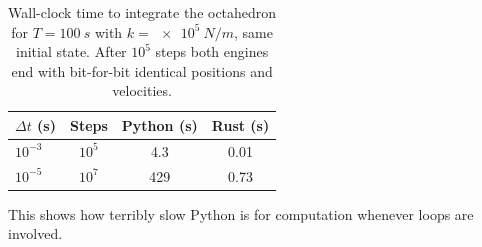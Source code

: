 \begin{table}[htb]
    \centering
    \caption{Wall-clock time to integrate the octahedron for $T=\SI{100}{s}$ with $k=\SI{e5}{N/m}$, same initial state. After $10^5$ steps both engines end with bit-for-bit identical positions and velocities.}
    \label{tab:performance}
    \small
    \begin{tabular}{@{}lccc@{}}
        \toprule
        $\Delta t$ (s) & Steps & Python (s) & Rust (s) \\
        \midrule
        $10^{-3}$ & $10^5$ & 4.3 & 0.01 \\
        $10^{-5}$ & $10^7$ & 429 & 0.73 \\
        \bottomrule
    \end{tabular}
\end{table}
This shows how terribly slow Python is for computation whenever loops are involved.
